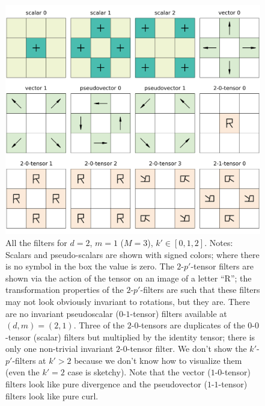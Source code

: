 \documentclass{article}
\newenvironment{hoggfigure}{%
  \begin{figure}[tp]%
    \begin{mdframed}%
    \color{captiongray}}{%
    \end{mdframed}%
  \end{figure}}
\theoremstyle{plain}
\begin{document}
\begin{hoggfigure}
  \begin{center}
\includegraphics[width=\textwidth]{notebooks/filter_2_3.png}
  \end{center}
\caption{All the filters for $d=2$, $m=1$ ($M=3$), $k'\in [0,1,2]$.
Notes: Scalars and pseudo-scalars are shown with signed colors; where there is no symbol in the box the value is zero. The $2$-$p'$-tensor filters are shown via the action of the tensor on an image of a letter ``R''; the transformation properties of the $2$-$p'$-filters are such that these filters may not look obviously invariant to rotations, but they are.
There are no invariant pseudoscalar ($0$-$1$-tensor) filters available at $(d,m) = (2,1)$.
Three of the $2$-$0$-tensors are duplicates of the $0$-$0$-tensor (scalar) filters but multiplied by the identity tensor; there is only one non-trivial invariant $2$-$0$-tensor filter.
We don't show the $k'$-$p'$-filters at $k'>2$ because we don't know how to visualize them (even the $k'=2$ case is sketchy).
Note that the vector ($1$-$0$-tensor) filters look like pure divergence and the pseudovector ($1$-$1$-tensor) filters look like pure curl.\label{fig:filters23}}
\end{hoggfigure}
\end{document}
